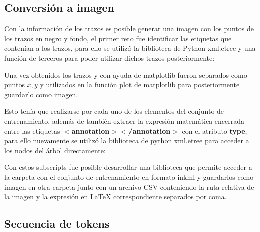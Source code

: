 \subsection{Conversión a imagen}
Con la información de los trazos es posible generar una imagen con los puntos de los trazos en negro y fondo, el primer reto fue identificar las etiquetas que contenían a los trazos, para ello se utilizó la biblioteca de Python xml.etree y una función de terceros para poder utilizar dichos trazos posteriormente:



Una vez obtenidos los trazos y con ayuda de matplotlib fueron separados como puntos $x,y$ y utilizados en la función plot de matplotlib para posteriormente guardarlo como imagen.



Esto tenía que realizarse por cada uno de los elementos del conjunto de entrenamiento, además de también extraer la expresión matemática encerrada entre las etiquetas \textbf{$<$annotation$><$/annotation$>$} con el atributo \textbf{type}, para ello nuevamente se utilizó la biblioteca de python xml.etree para acceder a los nodos del árbol directamente:

Con estos subscripts fue posible desarrollar una biblioteca que permite acceder a la carpeta con el conjunto de entrenamiento en formato inkml y guardarlos como imagen en otra carpeta junto con un archivo CSV conteniendo la ruta relativa de la imagen y la expresión en \LaTeX{} correspondiente separados por coma.
\subsection{Secuencia de tokens}

